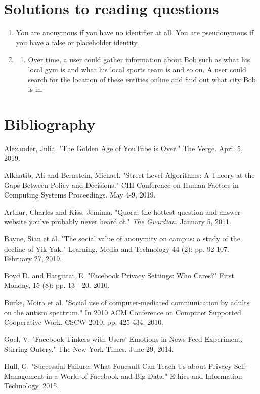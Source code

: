 \documentclass[class=book, crop=false]{standalone}
\begin{document}
\section{Solutions to reading questions}

\begin{enumerate}
    \item You are anonymous if you have no identifier at all. You are pseudonymous if you have a false or placeholder identity.
    
    \item
    \begin{enumerate}
        \item Over time, a user could gather information about Bob such as what his local gym is and what his local sports team is and so on. A user could search for the location of these entities online and find out what city Bob is in.
    \end{enumerate}
\end{enumerate}

\section{Bibliography}

Alexander, Julia. "The Golden Age of YouTube is Over." The Verge. April 5, 2019.

Alkhatib, Ali and Bernstein, Michael. "Street-Level Algorithms: A Theory at the Gaps Between Policy and Decisions." CHI Conference on Human Factors in Computing Systems Proceedings. May 4-9, 2019.

Arthur, Charles and Kiss, Jemima. "Quora: the hottest question-and-answer website you've probably never heard of." \textit{The Guardian}. January 5, 2011.

Bayne, Sian et al. "The social value of anonymity on campus: a study of the decline of Yik Yak." Learning, Media and Technology 44 (2): pp. 92-107. February 27, 2019.

Boyd D. and Hargittai, E. "Facebook Privacy Settings: Who Cares?" First Monday, 15 (8): pp. 13 - 20. 2010.

Burke, Moira et al. "Social use of computer-mediated communication by adults on the autism spectrum." In 2010 ACM Conference on Computer Supported Cooperative Work, CSCW 2010. pp. 425-434. 2010.

Goel, V. "Facebook Tinkers with Users' Emotions in News Feed Experiment, Stirring Outcry." The New York Times. June 29, 2014.

Hull, G. "Successful Failure: What Foucault Can Teach Us about Privacy Self-Management in a World of Facebook and Big Data." Ethics and Information Technology. 2015.
\end{document}
